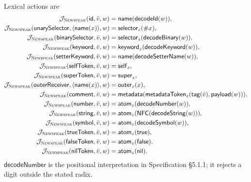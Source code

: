 Lexical actions are
\begin{equation}\label{eq:newspeak-literal-actions}
\begin{aligned}
 \mathcal J_{\textsc{Newspeak}}(\mathsf{id},\bar v,w)&=
   \mathsf{name}(\mathsf{decodeId}(w)),\\
 \mathcal J_{\textsc{Newspeak}}(\mathsf{unarySelector},\langle\mathsf{name}(x)\rangle,w)
   &=\mathsf{selector}_{z}(\#x),\\
 \mathcal J_{\textsc{Newspeak}}(\mathsf{binarySelector},\bar v,w)&=
   \mathsf{selector}_{z}(\mathsf{decodeBinary}(w)),\\
 \mathcal J_{\textsc{Newspeak}}(\mathsf{keyword},\bar v,w)&=
   \mathsf{keyword}_{z}(\mathsf{decodeKeyword}(w)),\\
 \mathcal J_{\textsc{Newspeak}}(\mathsf{setterKeyword},\bar v,w)&=
   \mathsf{name}(\mathsf{decodeSetterName}(w)),\\
 \mathcal J_{\textsc{Newspeak}}(\mathsf{selfToken},\bar v,w)&=\mathsf{self}_{z},\\
 \mathcal J_{\textsc{Newspeak}}(\mathsf{superToken},\bar v,w)&=\mathsf{super}_{z},\\
 \mathcal J_{\textsc{Newspeak}}(\mathsf{outerReceiver},
      \langle\mathsf{name}(x)\rangle,w)&=\mathsf{outer}_{z}(x),\\
 \mathcal J_{\textsc{Newspeak}}(\mathsf{comment},\bar v,w)&=
   \mathsf{metadata}(\mathsf{metadataToken}_{z}(\mathsf{tag}(\bar v),
      \mathsf{payload}(w))),\\
 \mathcal J_{\textsc{Newspeak}}(\mathsf{number},\bar v,w)&=
   \mathsf{atom}_{z}(\mathsf{decodeNumber}(w)),\\
 \mathcal J_{\textsc{Newspeak}}(\mathsf{string},\bar v,w)&=
   \mathsf{atom}_{z}(\mathsf{NFC}(\mathsf{decodeString}(w))),\\
 \mathcal J_{\textsc{Newspeak}}(\mathsf{symbol},\bar v,w)&=
   \mathsf{atom}_{z}(\mathsf{decodeSymbol}(w)),\\
 \mathcal J_{\textsc{Newspeak}}(\mathsf{trueToken},\bar v,w)&=\mathsf{atom}_{z}(\mathsf{true}),\\
 \mathcal J_{\textsc{Newspeak}}(\mathsf{falseToken},\bar v,w)&=\mathsf{atom}_{z}(\mathsf{false}),\\
 \mathcal J_{\textsc{Newspeak}}(\mathsf{nilToken},\bar v,w)&=\mathsf{atom}_{z}(\mathsf{nil}).
\end{aligned}
\end{equation}
$\mathsf{decodeNumber}$ is the positional interpretation in Specification
\S5.1.1; it rejects a digit outside the stated radix.

